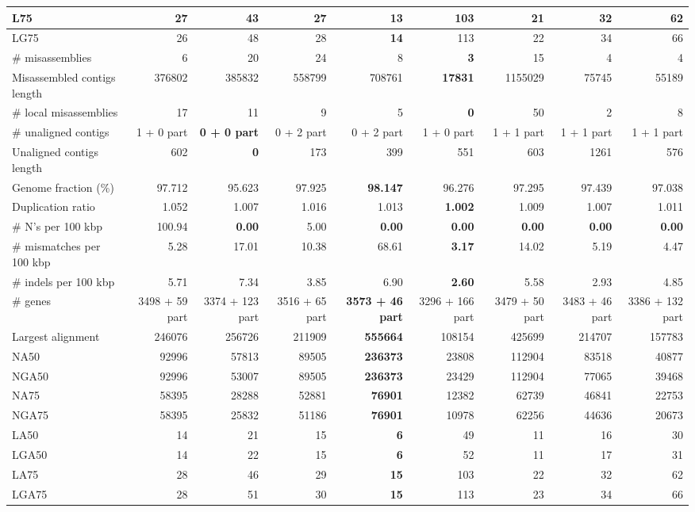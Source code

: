 \documentclass[12pt,a4paper]{article}
\begin{document}
\begin{table}[ht]
\begin{center}
\begin{tabular}{|l*{8}{|r}|}
L75 & 27 & 43 & 27 & {\bf 13} & 103 & 21 & 32 & 62 \\ \hline
LG75 & 26 & 48 & 28 & {\bf 14} & 113 & 22 & 34 & 66 \\ \hline
\# misassemblies & 6 & 20 & 24 & 8 & {\bf 3} & 15 & 4 & 4 \\ \hline
Misassembled contigs length & 376802 & 385832 & 558799 & 708761 & {\bf 17831} & 1155029 & 75745 & 55189 \\ \hline
\# local misassemblies & 17 & 11 & 9 & 5 & {\bf 0} & 50 & 2 & 8 \\ \hline
\# unaligned contigs & 1 + 0 part & {\bf 0 + 0 part} & 0 + 2 part & 0 + 2 part & 1 + 0 part & 1 + 1 part & 1 + 1 part & 1 + 1 part \\ \hline
Unaligned contigs length & 602 & {\bf 0} & 173 & 399 & 551 & 603 & 1261 & 576 \\ \hline
Genome fraction (\%) & 97.712 & 95.623 & 97.925 & {\bf 98.147} & 96.276 & 97.295 & 97.439 & 97.038 \\ \hline
Duplication ratio & 1.052 & 1.007 & 1.016 & 1.013 & {\bf 1.002} & 1.009 & 1.007 & 1.011 \\ \hline
\# N's per 100 kbp & 100.94 & {\bf 0.00} & 5.00 & {\bf 0.00} & {\bf 0.00} & {\bf 0.00} & {\bf 0.00} & {\bf 0.00} \\ \hline
\# mismatches per 100 kbp & 5.28 & 17.01 & 10.38 & 68.61 & {\bf 3.17} & 14.02 & 5.19 & 4.47 \\ \hline
\# indels per 100 kbp & 5.71 & 7.34 & 3.85 & 6.90 & {\bf 2.60} & 5.58 & 2.93 & 4.85 \\ \hline
\# genes & 3498 + 59 part & 3374 + 123 part & 3516 + 65 part & {\bf 3573 + 46 part} & 3296 + 166 part & 3479 + 50 part & 3483 + 46 part & 3386 + 132 part \\ \hline
Largest alignment & 246076 & 256726 & 211909 & {\bf 555664} & 108154 & 425699 & 214707 & 157783 \\ \hline
NA50 & 92996 & 57813 & 89505 & {\bf 236373} & 23808 & 112904 & 83518 & 40877 \\ \hline
NGA50 & 92996 & 53007 & 89505 & {\bf 236373} & 23429 & 112904 & 77065 & 39468 \\ \hline
NA75 & 58395 & 28288 & 52881 & {\bf 76901} & 12382 & 62739 & 46841 & 22753 \\ \hline
NGA75 & 58395 & 25832 & 51186 & {\bf 76901} & 10978 & 62256 & 44636 & 20673 \\ \hline
LA50 & 14 & 21 & 15 & {\bf 6} & 49 & 11 & 16 & 30 \\ \hline
LGA50 & 14 & 22 & 15 & {\bf 6} & 52 & 11 & 17 & 31 \\ \hline
LA75 & 28 & 46 & 29 & {\bf 15} & 103 & 22 & 32 & 62 \\ \hline
LGA75 & 28 & 51 & 30 & {\bf 15} & 113 & 23 & 34 & 66 \\ \hline
\end{tabular}
\end{center}
\end{table}
\end{document}
